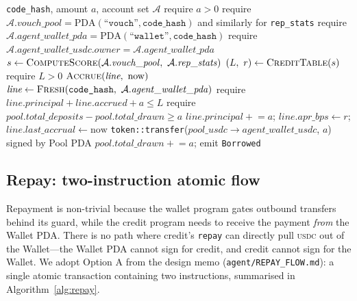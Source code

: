 \documentclass[10pt,conference,letterpaper]{IEEEtran}
\theoremstyle{definition}
\newcommand{\codehash}{\texttt{code\_hash}}
\newcommand{\PDA}[1]{\ensuremath{\mathrm{PDA}(#1)}}
\newcommand{\USDC}{\textsc{usdc}}
\begin{document}
\begin{algorithm}[t]
\caption{Credit borrow.}
\label{alg:borrow}
\begin{algorithmic}[1]
\Require \codehash, amount $a$, account set $\mathcal{A}$
\State require $a > 0$
\State require $\mathcal{A}.\mathit{vouch\_pool} = \PDA{\texttt{``vouch''}, \codehash}$
  and similarly for \texttt{rep\_stats}
\State require $\mathcal{A}.\mathit{agent\_wallet\_pda} = \PDA{\texttt{``wallet''}, \codehash}$
\State require $\mathcal{A}.\mathit{agent\_wallet\_usdc}.\mathit{owner} = \mathcal{A}.\mathit{agent\_wallet\_pda}$
\State $s \gets \textsc{ComputeScore}(\mathcal{A}.\mathit{vouch\_pool},\ \mathcal{A}.\mathit{rep\_stats})$
\State $(L,\ r) \gets \textsc{CreditTable}(s)$ 
\State require $L > 0$
  \State $\textsc{Accrue}(\textit{line},\ \mathrm{now})$ 
\Else
  \State $\textit{line} \gets \textsc{Fresh}(\codehash,\ \mathcal{A}.\mathit{agent\_wallet\_pda})$
\EndIf
\State require $\textit{line}.\mathit{principal} + \textit{line}.\mathit{accrued} + a \le L$
\State require $\mathit{pool}.\mathit{total\_deposits} - \mathit{pool}.\mathit{total\_drawn} \ge a$
\State $\textit{line}.\mathit{principal} \mathrel{+}= a$;
  $\textit{line}.\mathit{apr\_bps} \gets r$;
  $\textit{line}.\mathit{last\_accrual} \gets \mathrm{now}$
\State \texttt{token::transfer}($\mathit{pool\_usdc} \to \mathit{agent\_wallet\_usdc}$, $a$)
  signed by Pool PDA
\State $\mathit{pool}.\mathit{total\_drawn} \mathrel{+}= a$;
  emit \texttt{Borrowed}
\end{algorithmic}
\end{algorithm}

\subsection{Repay: two-instruction atomic flow}

Repayment is non-trivial because the wallet program gates outbound
transfers behind its guard, while the credit program needs to receive
the payment \emph{from} the Wallet PDA. There is no path where credit's
\texttt{repay} can directly pull \USDC{} out of the Wallet---the Wallet
PDA cannot sign for credit, and credit cannot sign for the Wallet. We
adopt Option A from the design memo (\texttt{agent/REPAY\_FLOW.md}): a
single atomic transaction containing two instructions, summarised in
Algorithm~\ref{alg:repay}.
\end{document}
